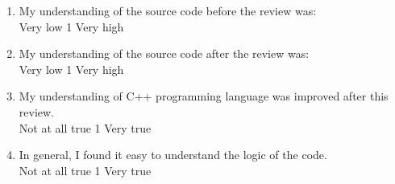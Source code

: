 \begin {enumerate}

\item My understanding of the  source code before the review was:
\\
Very low \hfill 1     \hfill Very high\\

\item My understanding of the source code after the review was:
\\
Very low \hfill 1     \hfill Very high\\


\item My understanding of C++ programming language was
improved after this review.
\\
Not at all true \hfill 1     \hfill Very true\\


\item In general, I found it easy to understand the logic of the code.
\\
Not at all true \hfill 1     \hfill Very true\\






\end{enumerate}
